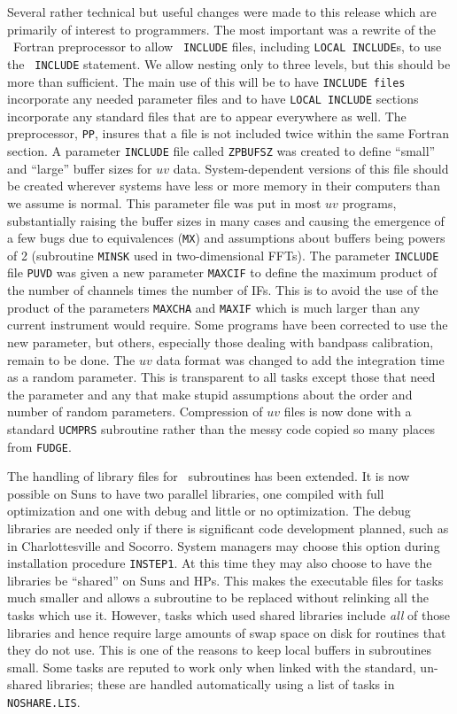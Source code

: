 Several rather technical but useful changes were made to this release
which are primarily of interest to programmers.  The most important
was a rewrite of the \AIPS\ Fortran preprocessor to allow {\tt
INCLUDE} files, including {\tt LOCAL INCLUDE}s, to use the {\tt
INCLUDE} statement.  We allow nesting only to three levels, but this
should be more than sufficient.  The main use of this will be to have
{\tt INCLUDE files} incorporate any needed parameter files and to have
{\tt LOCAL INCLUDE} sections incorporate any standard files that are
to appear everywhere as well.  The preprocessor, {\tt PP}, insures
that a file is not included twice within the same Fortran section.  A
parameter {\tt INCLUDE} file called {\tt ZPBUFSZ} was created to
define ``small'' and ``large'' buffer sizes for $uv$ data.
System-dependent versions of this file should be created wherever
systems have less or more memory in their computers than we assume is
normal.  This parameter file was put in most $uv$ programs,
substantially raising the buffer sizes in many cases and causing the
emergence of a few bugs due to equivalences ({\tt MX}) and assumptions
about buffers being powers of 2 (subroutine {\tt MINSK} used in
two-dimensional FFTs).  The parameter {\tt INCLUDE} file {\tt PUVD}
was given a new parameter {\tt MAXCIF} to define the maximum product
of the number of channels times the number of IFs.  This is to avoid
the use of the product of the parameters {\tt MAXCHA} and {\tt MAXIF}
which is much larger than any current instrument would require.  Some
programs have been corrected to use the new parameter, but others,
especially those dealing with bandpass calibration, remain to be done.
The $uv$ data format was changed to add the integration time as a
random parameter.  This is transparent to all tasks except those that
need the parameter and any that make stupid assumptions about the
order and number of random parameters.  Compression of $uv$ files is
now done with a standard {\tt UCMPRS} subroutine rather than the messy
code copied so many places from \hbox{{\tt FUDGE}}.

The handling of library files for \AIPS\ subroutines has been
extended.  It is now possible on Suns to have two parallel libraries,
one compiled with full optimization and one with debug and little or
no optimization.  The debug libraries are needed only if there is
significant code development planned, such as in Charlottesville and
Socorro.  System managers may choose this option during installation
procedure \hbox{{\tt INSTEP1}}.  At this time they may also choose to
have the libraries be ``shared'' on Suns and HPs.  This makes the
executable files for tasks much smaller and allows a subroutine to be
replaced without relinking all the tasks which use it.  However, tasks
which used shared libraries include {\it all} of those libraries and
hence require large amounts of swap space on disk for routines that
they do not use.  This is one of the reasons to keep local buffers in
subroutines small.  Some tasks are reputed to work only when linked
with the standard, un-shared libraries; these are handled automatically
using a list of tasks in \hbox{{\tt NOSHARE.LIS}}.

